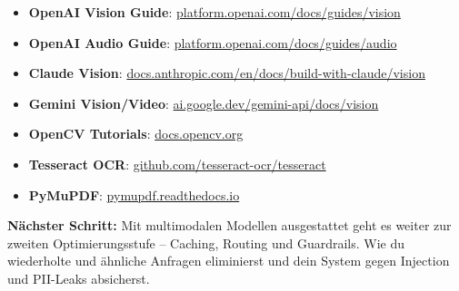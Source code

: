 \begin{itemize}[leftmargin=*]
    \item \textbf{OpenAI Vision Guide}: \href{https://platform.openai.com/docs/guides/vision}{platform.openai.com/docs/guides/vision}
    \item \textbf{OpenAI Audio Guide}: \href{https://platform.openai.com/docs/guides/audio}{platform.openai.com/docs/guides/audio}
    \item \textbf{Claude Vision}: \href{https://docs.anthropic.com/en/docs/build-with-claude/vision}{docs.anthropic.com/en/docs/build-with-claude/vision}
    \item \textbf{Gemini Vision/Video}: \href{https://ai.google.dev/gemini-api/docs/vision}{ai.google.dev/gemini-api/docs/vision}
    \item \textbf{OpenCV Tutorials}: \href{https://docs.opencv.org/}{docs.opencv.org}
    \item \textbf{Tesseract OCR}: \href{https://github.com/tesseract-ocr/tesseract}{github.com/tesseract-ocr/tesseract}
    \item \textbf{PyMuPDF}: \href{https://pymupdf.readthedocs.io/}{pymupdf.readthedocs.io}
\end{itemize}

\textbf{Nächster Schritt:} Mit multimodalen Modellen ausgestattet geht es weiter zur zweiten Optimierungsstufe -- Caching, Routing und Guardrails. Wie du wiederholte und ähnliche Anfragen eliminierst und dein System gegen Injection und PII-Leaks absicherst.
\endinput

\clearpage

